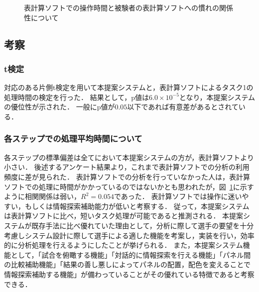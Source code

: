 \documentclass[sotsuron]{kuee}
\begin{document}
			\begin{figure}
				\begin{center}
				\end{center}
				\caption{表計算ソフトでの操作時間と被験者の表計算ソフトへの慣れの関係性について}
		  		\label{fig:result05}
			\end{figure}
		\subsection{考察}
			\subsubsection{t検定}
				対応のある片側t検定を用いて本提案システムと，表計算ソフトによるタスク1の処理時間の検定を行った．
				結果として，p値は$6.0 \times 10^{-5}$となり，本提案システムの優位性が示された．
				一般にp値が$0.05$以下であれば有意差があるとされている．
			\subsubsection{各ステップでの処理平均時間について}
				各ステップの標準偏差は全てにおいて本提案システムの方が，表計算ソフトより小さい．
				後述するアンケート結果より，これまで表計算ソフトでの分析の利用頻度に差が見られた．
				表計算ソフトでの分析を行っていなかった人は，表計算ソフトでの処理に時間がかかっているのではないかとも思われたが，図~\ref{fig:result05}に示すように相関関係は弱い，$R^2 = 0.054$であった．
				表計算ソフトでは操作に迷いやすい，もしくは情報探索補助能力が低いと考察する．
				従って，本提案システムは表計算ソフトに比べ，短いタスク処理が可能であると推測される．
				本提案システムが既存手法に比べ優れていた理由として，分析に際して選手の要望を十分考慮しシステム設計に際して選手による適した機能を考案し，実装を行い，効率的に分析処理を行えるようにしたことが挙げられる．
				また，本提案システム機能として，「試合を俯瞰する機能」「対話的に情報探索を行える機能」「パネル間の比較補助機能」「結果の善し悪しによってパネルの配置，配色を変えることで情報探索補助する機能」が備わっていることがその優れている特徴であると考察できる．
\end{document}
